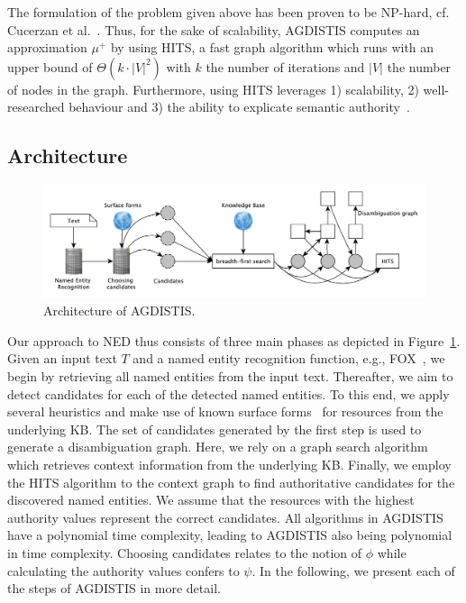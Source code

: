 The formulation of the problem given above has been proven to be NP-hard, cf. Cucerzan et al.~\cite{Cucerzan07}.
Thus, for the sake of scalability, AGDISTIS computes an approximation $\mu^{+}$ by using  \ac{HITS}, a fast graph algorithm which runs with an upper bound of $\Theta(k\cdot |V|^2)$ with $k$ the number of iterations and $|V|$ the number of nodes in the graph.
Furthermore, using \ac{HITS} leverages 1) scalability, 2) well-researched behaviour and 3) the ability to explicate semantic authority~\cite{HITS}. 

\subsection{Architecture}
\begin{figure}[h!tb]
\centering
\includegraphics[width=\linewidth]{part_02/unstructured_annotation/fig/overview.pdf}
\caption{Architecture of AGDISTIS.}
\label{fig:overview_agdistis}
\end{figure}

Our approach to \ac{NED} thus consists of three main phases as depicted in Figure~\ref{fig:overview_agdistis}.
Given an input text $T$ and a named entity recognition function, e.g., FOX~\cite{FOX}, we begin by retrieving all named entities from the input text.
Thereafter, we aim to detect candidates for each of the detected named entities.
To this end, we apply several heuristics and make use of known surface forms~\cite{spotlight} for resources from the underlying \ac{KB}.
The set of candidates generated by the first step is used to generate a disambiguation graph. 
Here, we rely on a graph search algorithm which retrieves context information from the underlying \ac{KB}. 
Finally, we employ the  \ac{HITS} algorithm to the context graph to find authoritative candidates for the discovered named entities.
We assume that the resources with the highest authority values represent the correct candidates.
All algorithms in AGDISTIS have a polynomial time complexity, leading to AGDISTIS also being polynomial in time complexity.
Choosing candidates relates to the notion of $\phi$ while calculating the authority values confers to $\psi$.
In the following, we present each of the steps of AGDISTIS in more detail.

